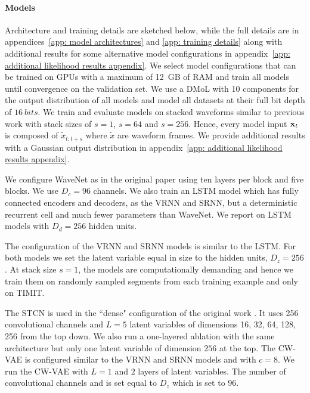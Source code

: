 {\paragraph{Models}
Architecture and training details are sketched below, while the full details are in appendices~\cref{app: model architectures} and \cref{app: training details} along with additional results for some alternative model configurations in appendix~\cref{app: additional likelihood results appendix}.
We select model configurations that can be trained on GPUs with a maximum of \SI{12}{GB} of RAM and train all models until convergence on the validation set.
We use a DMoL with 10 components for the output distribution of all models and model all datasets at their full bit depth of $\SI{16}{bits}$. We train and evaluate models on stacked waveforms similar to previous work \parencite{chung_recurrent_2015, fraccaro_sequential_2016, aksan_stcn_2019} with stack sizes of $s=1$, $s=64$ and $s=256$. Hence, every model input ${\mathbf{x}}_t$ is composed of $\tilde{x}_{t:t+s}$ where $\tilde{x}$ are waveform frames. We provide additional results with a Gaussian output distribution in appendix~\cref{app: additional likelihood results appendix}. 

We configure WaveNet as in the original paper using ten layers per block and five blocks. We use $D_c=96$ channels. 
We also train an LSTM model \parencite{hochreiter_long_1997} which has fully connected encoders and decoders, as the VRNN and SRNN, but a deterministic recurrent cell and much fewer parameters than WaveNet. We report on LSTM models with $D_d=256$ hidden units. 

The configuration of the VRNN and SRNN models is similar to the LSTM. For both models we set the latent variable equal in size to the hidden units, $D_z=256$. At stack size $s=1$, the models are computationally demanding and hence we train them on randomly sampled segments from each training example and only on TIMIT.

The STCN is used in the ``dense" configuration of the original work \parencite{aksan_stcn_2019}. It uses 256 convolutional channels and $L=5$ latent variables of dimensions 16, 32, 64, 128, 256 from the top down. We also run a one-layered ablation with the same architecture but only one latent variable of dimension $256$ at the top. 
The CW-VAE is configured similar to the VRNN and SRNN models and with $c=8$. 
We run the CW-VAE with $L=1$ and $2$ layers of latent variables. 
The number of convolutional channels and is set equal to $D_z$ which is set to 96.
%
}
